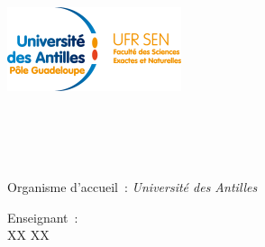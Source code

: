 \begin{titlepage}
	\begin{center}
		\includegraphics[scale=1.80]{../images/logo_ufr_sen.png} \\[2cm]
		\hspace{2cm}

		\HRule \\[0.4cm]
		\@title \\[0.4cm]
		\HRule \\[1cm]

		\@author \\ [1.5cm]

		{\large Organisme d'accueil~: \textsl{Université des Antilles}} \\[1.5cm]

		\begin{minipage}{0.7\textwidth}
			\begin{center}
				Enseignant~: \\
				\hspace{0.2cm}  XX \textsc{XX}
			\end{center}
		\end{minipage}\\[3cm]

		\@date
	\end{center}
\end{titlepage}

